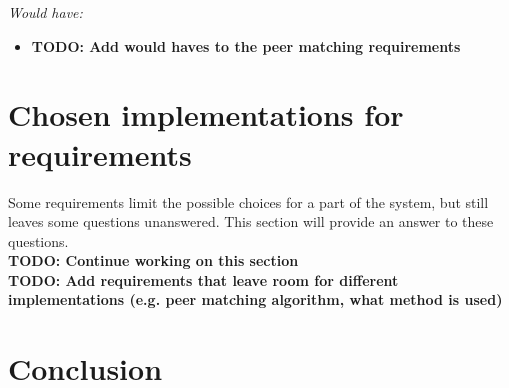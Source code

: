 \documentclass[]{article}
\newcommand{\TODO}[1]{{\color{red}\textbf{TODO: #1}}}
\begin{document}
\emph{Would have:}
\begin{itemize}
\item \TODO{Add would haves to the peer matching requirements}
\end{itemize}

\section{Chosen implementations for requirements}
Some requirements limit the possible choices for a part of the system, but still leaves some questions unanswered. This section will provide an answer to these questions.\\
\TODO{Continue working on this section}\\
\TODO{Add requirements that leave room for different implementations (e.g. peer matching algorithm, what method is used)}

\section{Conclusion}

\newpage


\end{document}
